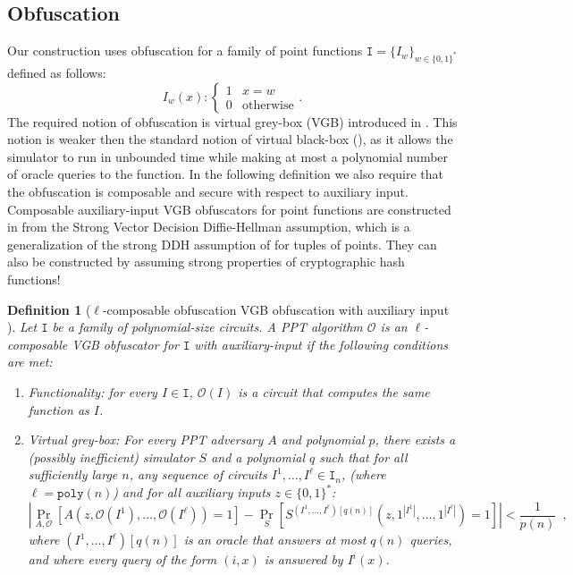 \documentclass[11pt]{article}
\newcommand{\zo}{\ensuremath{\{0, 1\}}}
\newcommand{\poly}{\ensuremath{\mathtt{poly}}\xspace}
\newtheorem{definition}[theorem]{Definition}
\begin{document}
\subsection{Obfuscation}
Our construction uses obfuscation for a family of point functions $\mathtt{I} = \{I_w\}_{w \in \zo^*}$ defined as follows:
\[
I_w(x):\begin{cases} 1 & x=w\\0 & \text{otherwise}\end{cases}.
\]
The required notion of obfuscation is virtual grey-box (VGB) introduced in \cite{bitansky2010strong}. This notion is weaker then the standard notion of virtual black-box (\cite{barak2001possibility}), as it allows the simulator to run in unbounded time while making at most a polynomial number of oracle queries to the function. In the following definition we also require that the obfuscation is composable and secure with respect to auxiliary input. Composable auxiliary-input VGB obfuscators for point functions are constructed in \cite[Theorem 6.1]{bitansky2010strong} from the Strong Vector Decision Diffie-Hellman assumption, which is a generalization of the strong DDH assumption of \cite{canetti1997towards} for tuples of points. They can also be constructed by assuming strong properties of cryptographic hash functions!\cite{canetti1997towards}

\begin{definition}[$\ell$-composable obfuscation VGB obfuscation with auxiliary input \cite{bitansky2010strong}]
\label{def:obf} Let $\mathtt{I}$ be a family of polynomial-size circuits.  A PPT algorithm $\mathcal{O}$ is an $\ell$-composable VGB obfuscator for $\mathtt{I}$ with auxiliary-input if the following conditions are met:
\begin{enumerate}
\item \emph{Functionality:} for every $ I \in \mathtt{I}$, $\mathcal{O}(I)$ is a circuit that computes the same function as $I$.
\item \emph{Virtual grey-box:}  For every PPT adversary $A$ and polynomial $p$, there exists a (possibly inefficient) simulator $S$ and a polynomial $q$ such that for all sufficiently large $n$, any  sequence of circuits $I^1,\dots,I^\ell \in \mathtt{I}_n$, (where $\ell=\poly(n)$) and for all auxiliary inputs $z\in \zo^*$:
\[
|\Pr_{A,\mathcal{O}}[A(z,\mathcal{O}(I^1),\dots,\mathcal{O}(I^\ell)) = 1] - \Pr_{S}[S^{(I^1,\dots,I^\ell)[q(n)]}(z, 1^{|I^1|},\dots,1^{|I^\ell|}) = 1] | < \frac{1}{p(n)} \enspace,
\]
where $(I^1,\dots,I^\ell)[q(n)]$ is an oracle that answers at most $q(n)$ queries, and where every query of the form $(i,x)$ is answered by $I^i(x)$.
\end{enumerate}
\end{definition}
\end{document}
